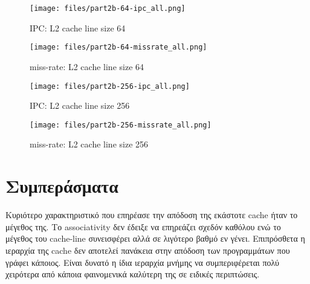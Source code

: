 \documentclass[a4paper,12pt]{article}
\begin{document}
\begin{figure}[H]
    \centering
    \texttt{[image: files/part2b-64-ipc\_all.png]}
    \caption{IPC: L2 cache line size 64}
\end{figure}

\begin{figure}[H]
    \centering
    \texttt{[image: files/part2b-64-missrate\_all.png]}
    \caption{miss-rate: L2 cache line size 64}
\end{figure}

\begin{figure}[H]
    \centering
    \texttt{[image: files/part2b-256-ipc\_all.png]}
    \caption{IPC: L2 cache line size 256}
\end{figure}

\begin{figure}[H]
    \centering
    \texttt{[image: files/part2b-256-missrate\_all.png]}
    \caption{miss-rate: L2 cache line size 256}
\end{figure}

\section{Συμπεράσματα}
Κυριότερο χαρακτηριστικό που επηρέασε την απόδοση της εκάστοτε cache ήταν το
μέγεθος της. Το associativity δεν έδειξε να επηρεάζει σχεδόν καθόλου ενώ το
μέγεθος του cache-line συνεισφέρει αλλά σε λιγότερο βαθμό εν γένει.
Επιπρόσθετα η ιεραρχία της cache δεν αποτελεί πανάκεια στην απόδοση των
προγραμμάτων που γράφει κάποιος. Είναι δυνατό η ίδια ιεραρχία μνήμης να
συμπεριφέρεται πολύ χειρότερα από κάποια φαινομενικά καλύτερη της σε ειδικές
περιπτώσεις.

\end{document}
